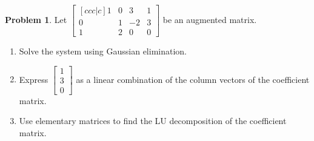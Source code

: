 \documentclass[oneside]{book}
\theoremstyle{definition}
\newtheorem{problem}{Problem}[section]
\begin{document}
\begin{problem}
Let $\begin{bmatrix}[ccc|c] 1 & 0 & 3 & 1 \\ 0 & 1 & -2 & 3 \\ 1 & 2 & 0 & 0 \end{bmatrix}$ be an augmented matrix.
\begin{enumerate}
\item Solve the system using Gaussian elimination.
\item Express $\begin{bmatrix} 1 \\ 3 \\ 0\end{bmatrix}$ as a linear combination of the column vectors of the coefficient matrix.
\item Use elementary matrices to find the LU decomposition of the coefficient matrix.
\end{enumerate}
\end{problem}
\end{document}

